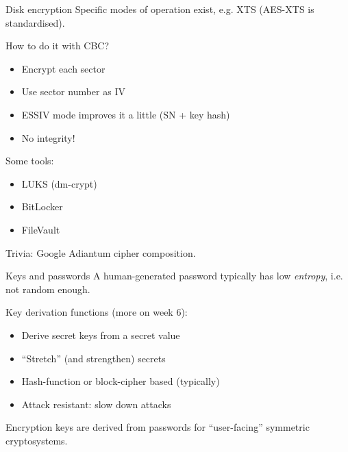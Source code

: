 \begin{frame}{Disk encryption}
  Specific modes of operation exist, e.g. XTS (AES-XTS is standardised).

  \pause
  How to do it with CBC?
  \begin{itemize}[<+(1)->]
    \item Encrypt each sector
    \item Use sector number as IV
    \item ESSIV mode improves it a little (SN + key hash)
    \item No integrity!
  \end{itemize}

  \pause
  Some tools:
  \begin{itemize}[<+(1)->]
    \item LUKS (dm-crypt)
    \item BitLocker
    \item FileVault
  \end{itemize}

  \pause
  Trivia: Google Adiantum cipher composition.
\end{frame}

\begin{frame}{Keys and passwords}
  \pause
  A human-generated password typically has low \emph{entropy}, i.e. not random enough.

  \pause
  Key derivation functions (more on week 6):
  \begin{itemize}[<+(1)->]
    \item Derive secret keys from a secret value
    \item \enquote{Stretch} (and strengthen) secrets
    \item Hash-function or block-cipher based (typically)
    \item Attack resistant: slow down attacks
  \end{itemize}

  \pause
  Encryption keys are derived from passwords for \enquote{user-facing} symmetric cryptosystems.
\end{frame}


